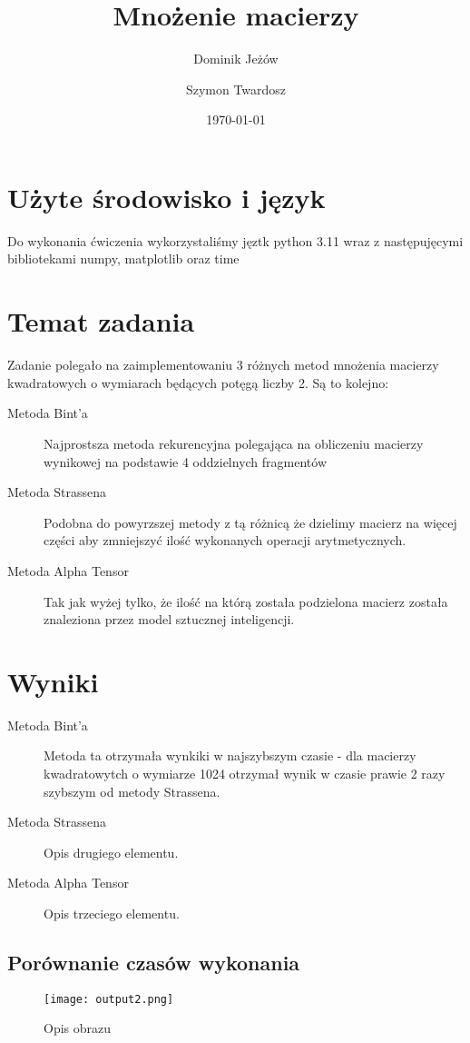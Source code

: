\documentclass{article}
\title{Mnożenie macierzy}
\author{Dominik Jeżów}
\author{Szymon Twardosz}
\date{\today}
\begin{document}
\maketitle

\section{Użyte środowisko i język}
Do wykonania ćwiczenia wykorzystaliśmy jęztk python 3.11 wraz z następujęcymi bibliotekami
numpy, matplotlib oraz time

\section{Temat zadania}
Zadanie polegało na zaimplementowaniu 3 różnych metod mnożenia macierzy kwadratowych o wymiarach będących potęgą liczby 2. Są to kolejno:
\begin{description}
    \item[Metoda Bint'a] Najprostsza metoda rekurencyjna polegająca na obliczeniu macierzy wynikowej na podstawie 4 oddzielnych fragmentów
    \item[Metoda Strassena] Podobna do powyrzszej metody z tą różnicą że dzielimy macierz na więcej części aby zmniejszyć ilość wykonanych operacji arytmetycznych.
    \item[Metoda Alpha Tensor] Tak jak wyżej tylko, że ilość na którą została podzielona macierz została znaleziona przez model sztucznej inteligencji.
  \end{description}

\section{Wyniki}
\begin{description}
    \item[Metoda Bint'a] Metoda ta otrzymała wynkiki w
    najszybszym czasie - dla macierzy kwadratowytch o wymiarze 1024 otrzymał wynik w czasie prawie 2 razy szybszym od metody Strassena.
    \item[Metoda Strassena] Opis drugiego elementu.
    \item[Metoda Alpha Tensor] Opis trzeciego elementu.
  \end{description}

\subsection{Porównanie czasów wykonania}
\begin{figure}
    \centering
    \texttt{[image: output2.png]}
    \caption{Opis obrazu}
    \label{fig:obraz}
\end{figure}
\end{document}
